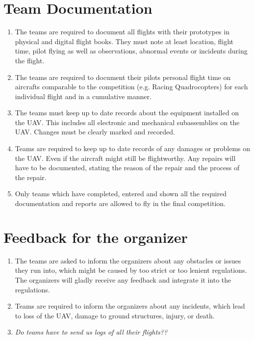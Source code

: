     \section{Team Documentation}
    \begin{enumerate}
      \item The teams are required to document all flights with their prototypes in physical and digital flight books. They must note at least location, flight time, pilot flying 
      as well as observations, abnormal events or incidents during the flight.
      \item The teams are required to document their pilots personal flight time on aircrafts comparable to the competition (e.g. Racing Quadrocopters)
      for each individual flight and in a cumulative manner. 
      \item The teams must keep up to date records about the equipment installed on the UAV. This includes all electronic and mechanical subassemblies on the UAV. 
      Changes must be clearly marked and recorded. 
      \item Teams are required to keep up to date records of any damages or problems on the UAV. Even if the aircraft might still be flightworthy. 
      Any repairs will have to be documented, stating the reason of the repair and the process of the repair. 
      \item Only teams which have completed, entered and shown all the required documentation and reports are allowed to fly in the final competition. 
    \end{enumerate}

    \section{Feedback for the organizer}
    \begin{enumerate}
      \item The teams are asked to inform the organizers about any obstacles or issues they run into, which might be caused by
      too strict or too lenient regulations. The organizers will gladly receive any feedback and integrate it into the regulations. 
      \item Teams are required to inform the organizers about any incidents, which lead to loss of the UAV, damage to ground structures, injury, or death. 
      \item \emph{Do teams have to send us logs of all their flights??}
    \end{enumerate}

